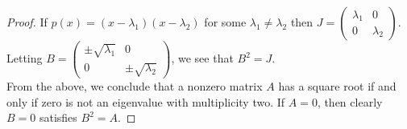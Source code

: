 \documentclass[../../AlgebraQualSolutions.tex]{subfiles}
\begin{document}
\begin{proof}
    If $p(x) = (x-\lambda_1)(x-\lambda_2)$ for some $\lambda_1 \neq \lambda_2$ then $J = \begin{pmatrix} \lambda_1 & 0\\ 0 & \lambda_2 \end{pmatrix}$. Letting $B = \begin{pmatrix} \pm \sqrt{\lambda_1} & 0\\ 0 & \pm\sqrt{\lambda_2} \end{pmatrix}$, we see that $B^2 = J$.\\

    From the above, we conclude that a nonzero matrix $A$ has a square root if and only if zero is not an eigenvalue with multiplicity two. If $A = 0$, then clearly $B = 0$ satisfies $B^2 = A$.
\end{proof}
\end{document}
